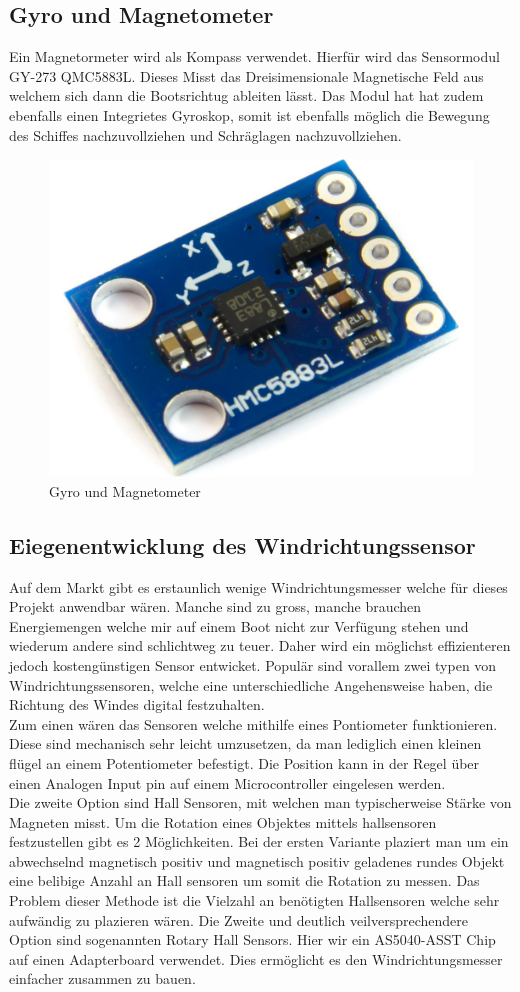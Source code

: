 \subsection{Gyro und Magnetometer}

Ein Magnetormeter wird als Kompass verwendet. Hierfür wird das Sensormodul GY-273 QMC5883L. Dieses Misst das Dreisimensionale Magnetische Feld aus welchem sich dann die Bootsrichtug ableiten lässt. Das Modul hat hat zudem ebenfalls einen Integrietes Gyroskop, somit ist ebenfalls möglich die Bewegung des Schiffes nachzuvollziehen und Schräglagen nachzuvollziehen. 

\begin{figure}[H]
    \centering
    \includegraphics[width=0.5\linewidth]{assets/magnetometer.jpg}
    \caption{Gyro und Magnetometer}
\end{figure}


\subsection{Eiegenentwicklung des Windrichtungssensor}
Auf dem Markt gibt es erstaunlich wenige Windrichtungsmesser welche für dieses Projekt anwendbar wären. Manche sind zu gross, manche brauchen Energiemengen welche mir auf einem Boot nicht zur Verfügung stehen und wiederum andere sind schlichtweg zu teuer. Daher wird ein möglichst effizienteren jedoch kostengünstigen Sensor entwicket.
Populär sind vorallem zwei typen von Windrichtungssensoren, welche eine unterschiedliche Angehensweise haben, die Richtung des Windes digital festzuhalten. \\
Zum einen wären das Sensoren welche mithilfe eines Pontiometer funktionieren. Diese sind mechanisch sehr leicht umzusetzen, da man lediglich einen kleinen flügel an einem Potentiometer befestigt. Die Position kann in der Regel über einen Analogen Input pin auf einem Microcontroller eingelesen werden.
\\
Die zweite Option sind Hall Sensoren, mit welchen man typischerweise Stärke von Magneten misst. Um die Rotation eines Objektes mittels hallsensoren festzustellen gibt es 2 Möglichkeiten. Bei der ersten Variante plaziert man um ein abwechselnd magnetisch positiv und magnetisch positiv geladenes rundes Objekt eine belibige Anzahl an Hall sensoren um somit die Rotation zu messen. Das Problem dieser Methode ist die Vielzahl an benötigten Hallsensoren welche sehr aufwändig zu plazieren wären. Die Zweite und deutlich veilversprechendere Option sind sogenannten Rotary Hall Sensors. Hier wir ein AS5040-ASST Chip auf einen Adapterboard verwendet. Dies ermöglicht es den Windrichtungsmesser einfacher zusammen zu bauen.

